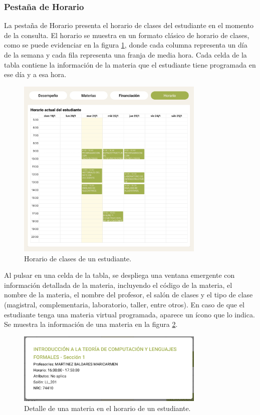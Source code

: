 \subsubsection{Pestaña de Horario}

La pestaña de Horario presenta el horario de clases del estudiante en el momento de la consulta. El horario se muestra en un formato clásico de horario de clases, como se puede evidenciar en la figura \ref{fig:horario}, donde cada columna representa un día de la semana y cada fila representa una franja de media hora. Cada celda de la tabla contiene la información de la materia que el estudiante tiene programada en ese día y a esa hora. 

\begin{figure}[H]
  \centering
  \includegraphics[width=0.8\textwidth]{img/nes/horario.png}
  \caption{Horario de clases de un estudiante.}
  \label{fig:horario}
\end{figure}

Al pulsar en una celda de la tabla, se despliega una ventana emergente con información detallada de la materia, incluyendo el código de la materia, el nombre de la materia, el nombre del profesor, el salón de clases y el tipo de clase (magistral, complementaria, laboratorio, taller, entre otros). En caso de que el estudiante tenga una materia virtual programada, aparece un ícono que lo indica. Se muestra la información de una materia en la figura \ref{fig:detalle_horario}.

\begin{figure}[H]
  \centering
  \includegraphics[width=0.8\textwidth]{img/nes/detalle_horario.png}
  \caption{Detalle de una materia en el horario de un estudiante.}
  \label{fig:detalle_horario}
\end{figure}

